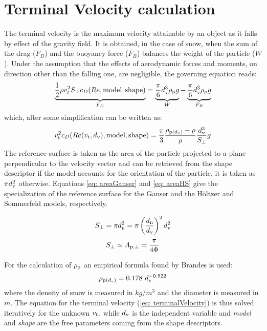 	\section{Terminal Velocity calculation}
		The terminal velocity is the maximum velocity attainable by an object as it falls by effect of the gravity field. It is obtained, in the case of snow, when the sum of the drag ($ F_{D} $) and the buoyancy force ($ F_B $) balances the weight of the particle ($ W $). Under the assumption that the effects of aerodynamic forces and moments, on direction other than the falling one, are negligible, the governing equation reads:
		\begin{equation}
			\underbrace{\frac{1}{2} \rho v_t^2 S_{\perp} c_D(Re, \text{model}, \text{shape})}_{F_{D}} = 
			\underbrace{\frac{\pi}{6} d_{\textup{v}}^3 \rho_{\textup{p}} g}_{W} - 
			\underbrace{\frac{\pi}{6} d_{\textup{v}}^3 \rho_{\textup{p}} g}_{F_B}
			\label{eq: governing}
		\end{equation}
		which, after some simplification can be written as:
		\begin{equation}
			v_{\textup{t}}^2 c_D(Re(v_{\textup{t}}, d_{\textup{v}}), \text{model}, \text{shape}) = 
			\frac{\pi}{3} \dfrac{\rho_{\textup{p}(d_{\textup{v}})} - \rho}{\rho} \dfrac{d_{\textup{v}}^3}{S_{\perp}} g
			\label{eq: terminalVelocity}
		\end{equation}
		The reference surface is taken as the area of the particle projected to a plane perpendicular to the velocity vector and can be retrieved from the shape descriptor if the model accounts for the orientation of the particle, it is taken as $ \pi d_{\textup{v}}^2 $ otherwise. Equations \ref{eq: areaGanser} and \ref{eq: areaHS} give the specialization of the reference surface for the Ganser and the H\"oltzer and Sommerfeld models, respectively.
		\begin{multicols}{2}
			\begin{equation}
				S_{\perp} = \pi d_{\textup{n}}^2 = \pi \left( \frac{d_{\textup{n}}}{d_{\textup{v}}} \right)^2 d_{\textup{v}}^2
				\label{eq: areaGanser}
			\end{equation}\break
			\begin{equation}
				S_{\perp} \simeq A_{\textup{p}, \perp} = \dfrac{\pi}{4 \Phi}
				\label{eq: areaHS}
			\end{equation}
		\end{multicols}
		
		For the calculation of $ \rho_{\textup{p}} $ an empirical formula found by Brandes \cite{Brandes-2008} is used:
		\begin{equation}
			\rho_{\textup{p}(\dv)} = 0.178\ \dv^{-0.922}
		\end{equation}
		where the density of snow is measured in $ kg / m^3 $ and the diameter is measured in $ m $. 
		The equation for the terminal velocity (\ref{eq: terminalVelocity}) is thus solved iteratively for the unknown $ v_{\textup{t}} $, while $ d_{\textup{v}} $ is the independent variable and \textit{model} and \textit{shape} are the free parameters coming from the shape descriptors.
		
	
